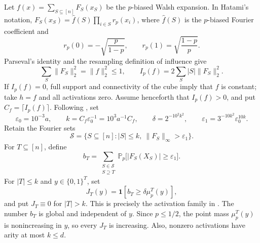 \documentclass[11pt,letterpaper]{article}
\theoremstyle{definition}
\theoremstyle{remark}
\newcommand{\bits}{\{0,1\}}
\renewcommand{\Pr}{\mathbb P}
\newcommand{\one}{\mathbf 1}
\newcommand{\cS}{\mathcal S}
\begin{document}
Let $f(x)=\sum_{S\subseteq[n]}F_S(x_S)$ be the $p$-biased Walsh expansion.  In Hatami's notation,
$F_S(x_S)=\widehat f(S)\prod_{i\in S}r_p(x_i)$, where
$\widehat f(S)$ is the $p$-biased Fourier coefficient and
\[
       r_p(0)=-\sqrt{\frac{p}{1-p}},
       \qquad
       r_p(1)=\sqrt{\frac{1-p}{p}}.
\]
Parseval's identity and the resampling definition of influence give
\[
       \sum_S\|F_S\|_2^2=\|f\|_2^2\le1,
       \qquad
       I_p(f)=2\sum_S |S|\|F_S\|_2^2.
\]
If $I_p(f)=0$, full support and connectivity of the cube imply that $f$ is
constant; take $h=f$ and all activations zero.  Assume henceforth that
$I_p(f)>0$, and put $C_f=\lceil I_p(f)\rceil$.  Following
\cite[Section~4]{Hatami2012}, set
\[
  \varepsilon_0=10^{-3}a,
  \qquad
  k=C_f\varepsilon_0^{-1}=10^3a^{-1}C_f,
  \qquad
  \delta=2^{-10^2k^2},
  \qquad
  \varepsilon_1=3^{-10k^2}\varepsilon_0^{10k}.
\]
Retain the Fourier sets
\[
       \cS=\{S\subseteq[n]: |S|\le k,
                    \ \|F_S\|_\infty>\varepsilon_1\}.
\]
For $T\subseteq[n]$, define
\[
       b_T=\sum_{\substack{S\in\cS\\S\supseteq T}}
       \Pr_p\bigl[|F_S(X_S)|\ge\varepsilon_1\bigr].
\]
For $|T|\le k$ and $y\in\bits^T$, set
\begin{equation}
\label{eq:hatami-activation}
       J_T(y)=\one[b_T\ge\delta\mu_p^T(y)],
\end{equation}
and put $J_T\equiv0$ for $|T|>k$.  This is precisely the activation family in
\cite[Section~4.3]{Hatami2012}.  The number $b_T$ is global and independent of
$y$.  Since $p\le1/2$, the point mass $\mu_p^T(y)$ is nonincreasing in $y$, so
every $J_T$ is increasing.  Also, nonzero activations have arity at most
$k\le d$.
\end{document}
